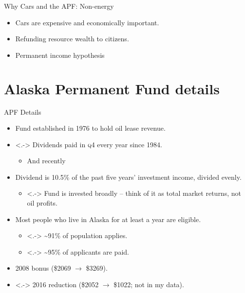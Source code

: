 \documentclass[aspectratio=169]{beamer}
\begin{document}
\begin{frame}{Why Cars and the APF: Non-energy}
	\begin{itemize}
		\item Cars are expensive and economically important.
		\item Refunding resource wealth to citizens.
		\item Permanent income hypothesis \parencite{hsieh2003}
	\end{itemize}
\end{frame}


\section[APF Details]{Alaska Permanent Fund details}
\begin{frame}{APF Details}
	\begin{itemize}[<+->]
		\item Fund established in 1976 to hold oil lease revenue.
		\item<.-> Dividends paid in \textsc{q}4 every year since 1984.
		\begin{itemize}
			\item And recently
		\end{itemize}
		\item Dividend is 10.5\% of the past five years' investment income, divided evenly.
		\begin{itemize}
			\item<.-> Fund is invested broadly -- think of it as total market returns, not oil profits.
		\end{itemize}
		\item Most people who live in Alaska for at least a year are eligible.
		\begin{itemize}
			\item<.-> \textasciitilde91\% of population applies.
			\item<.-> \textasciitilde95\% of applicants are paid.
		\end{itemize}
		\item 2008 bonus (\$2069 $\rightarrow$ \$3269).
		\item<.-> 2016 reduction (\$2052 $\rightarrow$ \$1022; not in my data).
	\end{itemize}
\end{frame}
\end{document}
